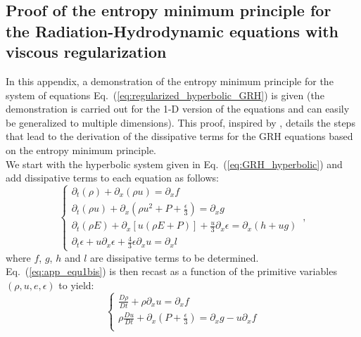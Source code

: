 \documentclass[review]{elsarticle}
\newcommand{\eqt}[1]{Eq.~(\ref{#1})}                     %
\begin{document}
\newpage
\begin{appendices}
\section{Proof of the entropy minimum principle for the Radiation-Hydrodynamic equations with viscous regularization}
\label{app:appendixA}

In this appendix, a demonstration of the entropy minimum principle for the system of equations \eqt{eq:regularized_hyperbolic_GRH} is given (the demonstration is carried out for the 1-D version of the equations and can easily be generalized to multiple dimensions). This proof, inspired by \cite{jlg}, details the steps that lead to the derivation of the dissipative terms for the GRH equations based on the entropy minimum principle.\\
We start with the hyperbolic system given in \eqt{eq:GRH_hyperbolic} and add dissipative terms to each equation as follows:
\begin{equation}
\label{eq:app_equ1bis}
\left\{
\begin{array}{llll}
\partial_t (\rho  ) + \partial_x (\rho u)  = \partial_x f \\
\partial_t (\rho u) + \partial_x \left(\rho u^2 +  P + \frac{\epsilon}{3} \right) = \partial_x g  \\
\partial_t (\rho E) + \partial_x \left[ u \left( \rho E +P \right) \right] + \frac{u}{3} \partial_x \epsilon = \partial_x \left( h + ug \right) \\
\partial_t \epsilon + u \partial_x \epsilon + \frac{4}{3} \epsilon \partial_x u = \partial_x l
\end{array}
\right. \,,
\end{equation}
where $f$, $g$, $h$ and $l$ are dissipative terms to be determined.
\eqt{eq:app_equ1bis} is then recast as a function of the primitive variables $(\rho, u, e, \epsilon)$ to yield:
\begin{equation}
\label{eq:app_equ1}
\left\{
\begin{array}{llll}
\frac{D \rho}{Dt} + \rho \partial_x u = \partial_x f \\
\rho \frac{Du}{Dt} + \partial_x \left( P + \frac{\epsilon}{3} \right) = \partial_x g - u \partial_x f  \\

\end{array}
\end{equation}
\end{appendices}
\end{document}
